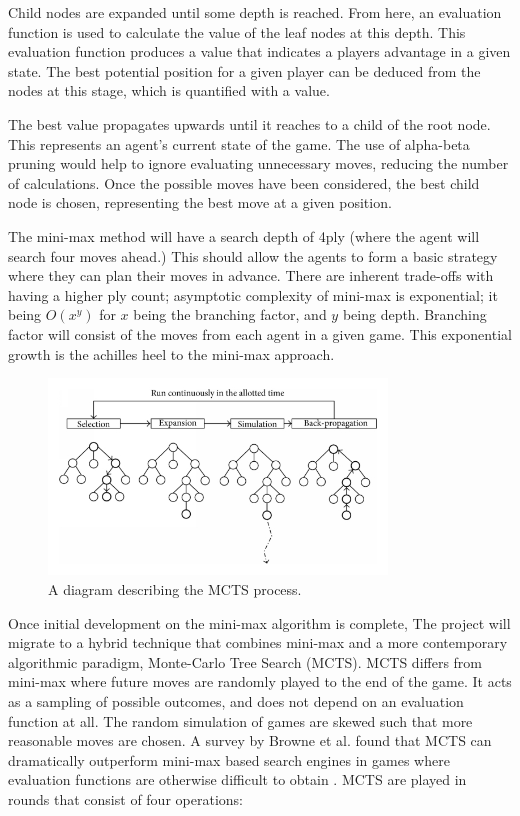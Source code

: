 \documentclass[12pt,a4paper]{article}
\begin{document}
    Child nodes are expanded until some depth is reached. From here, an evaluation function is used to calculate the value of the leaf nodes at this depth. This evaluation function produces a value that indicates a players advantage in a given state. The best potential position for a given player can be deduced from the nodes at this stage, which is quantified with a value.

    The best value propagates upwards until it reaches to a child of the root node. This represents an agent's current state of the game. The use of alpha-beta pruning would help to ignore evaluating unnecessary moves, reducing the number of calculations. Once the possible moves have been considered, the best child node is chosen, representing the best move at a given position.

    The mini-max method will have a search depth of 4ply (where the agent will search four moves ahead.) This should allow the agents to form a basic strategy where they can plan their moves in advance. There are inherent trade-offs with having a higher ply count; asymptotic complexity of mini-max is exponential; it being $O(x^y)$ for $x$ being the branching factor, and $y$ being depth. Branching factor will consist of the moves from each agent in a given game. This exponential growth is the achilles heel to the mini-max approach.

    \begin{figure}
        \centering
        \includegraphics[width=90mm]{montecarlo.png}
        \caption{A diagram describing the MCTS process.}
    \end{figure}

    Once initial development on the mini-max algorithm is complete, The project will migrate to a hybrid technique that combines mini-max and a more contemporary algorithmic paradigm, Monte-Carlo Tree Search (MCTS). MCTS differs from mini-max where future moves are randomly played to the end of the game. It acts as a sampling of possible outcomes, and does not depend on an evaluation function at all. The random simulation of games are skewed such that more reasonable moves are chosen. A survey by Browne et al. found that MCTS can dramatically outperform mini-max based search engines in games where evaluation functions are otherwise difficult to obtain \cite{browne_survey_2012}. MCTS are played in rounds that consist of four operations:
\end{document}
